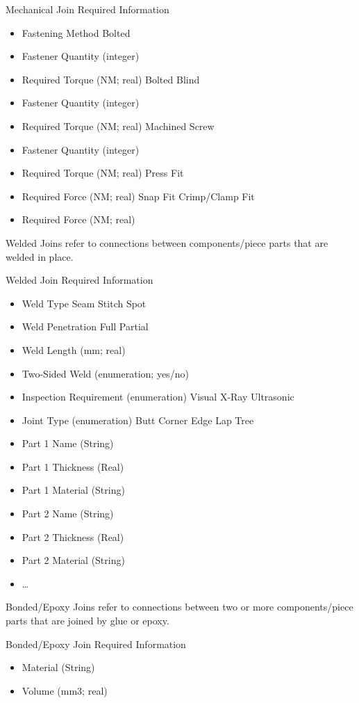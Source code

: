 Mechanical Join Required Information
\begin{itemize}
\item Fastening Method
\subitem Bolted
\item Fastener Quantity (integer)
\item Required Torque (NM; real)
\subitem Bolted Blind
\item Fastener Quantity (integer)
\item Required Torque (NM; real)
\subitem Machined Screw
\item Fastener Quantity (integer)
\item Required Torque (NM; real)
\subitem Press Fit
\item Required Force (NM; real)
\subitem Snap Fit
\subitem Crimp/Clamp Fit
\item Required Force (NM; real)
\end{itemize}

Welded Joins refer to connections between components/piece parts that are welded in place.

Welded Join Required Information
\begin{itemize}
\item Weld Type
\subitem Seam
\subitem Stitch
\subitem Spot
\item Weld Penetration
\subitem Full
\subitem Partial
\item Weld Length (mm; real)
\item Two-Sided Weld (enumeration; yes/no)
\item Inspection Requirement (enumeration)
\subitem Visual
\subitem X-Ray
\subitem Ultrasonic
\item Joint Type (enumeration)
\subitem Butt
\subitem Corner
\subitem Edge
\subitem Lap
\subitem Tree
\item Part 1 Name (String)
\item Part 1 Thickness (Real)
\item Part 1 Material (String)
\item Part 2 Name (String)
\item Part 2 Thickness (Real)
\item Part 2 Material (String)
\item …
\end{itemize}

Bonded/Epoxy Joins refer to connections between two or more components/piece parts that are joined by glue or epoxy.

Bonded/Epoxy Join Required Information
\begin{itemize}
\item Material (String)
\item Volume (mm3; real)
\end{itemize}

